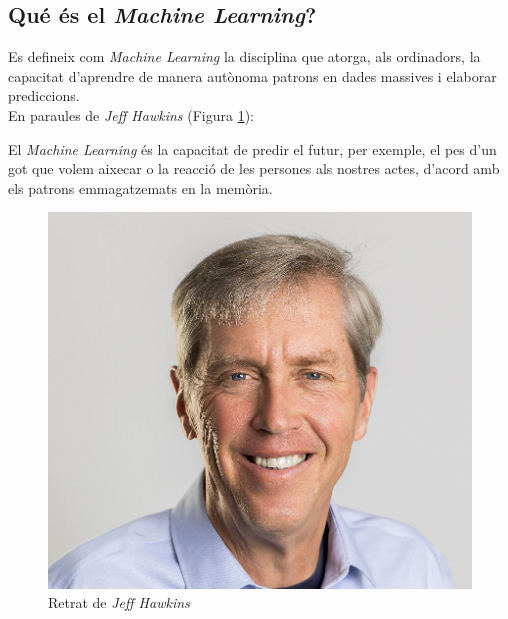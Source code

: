 \documentclass[a4paper,12pt]{article}
\begin{document}
\subsection*{Qué és el \textit{Machine Learning}?}
Es defineix com \textit{Machine Learning} la disciplina que atorga, als ordinadors, la capacitat d'aprendre de manera autònoma patrons en dades massives i elaborar prediccions.\\
En paraules de \textit{Jeff Hawkins} (Figura \ref{fig:hawkins}):
\begin{center}
    \begin{minipage}{0.9\linewidth}
        \vspace{5pt}
        {\small
            El \textit{Machine Learning} és la capacitat de predir el futur, per exemple, el pes d'un got que volem aixecar o la reacció de les persones als nostres actes, d'acord amb els patrons emmagatzemats en la memòria.
        }
        \vspace{5pt}
    \end{minipage}
\end{center}
\begin{figure}[H]
    \centering
    \includegraphics[scale = 0.3]{images/b2a43a485uokuohjp5l7peo9f0.jpg}
    \caption{Retrat de \textit{Jeff Hawkins}}
    \label{fig:hawkins}
\end{figure}
\end{document}
